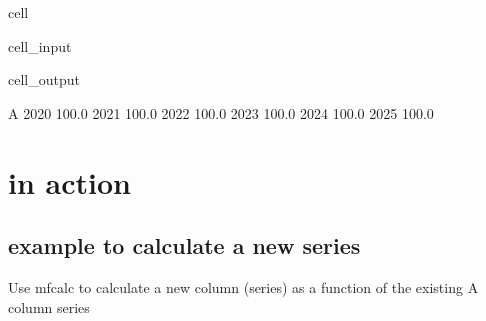 \documentclass[letterpaper,10pt,english]{jupyterBook}
\begin{document}
\begin{sphinxuseclass}{cell}\begin{sphinxVerbatimInput}

\begin{sphinxuseclass}{cell_input}
\begin{sphinxVerbatim}[commandchars=\\\{\}]
                                   
                                               
    \PYG{p}{[}    \PYG{p}{]}           
    \PYG{p}{[}\PYG{p}{]}                                  
   
\end{sphinxVerbatim}

\end{sphinxuseclass}\end{sphinxVerbatimInput}
\begin{sphinxVerbatimOutput}

\begin{sphinxuseclass}{cell_output}
\begin{sphinxVerbatim}[commandchars=\\\{\}]
          A
2020  100.0
2021  100.0
2022  100.0
2023  100.0
2024  100.0
2025  100.0
\end{sphinxVerbatim}

\end{sphinxuseclass}\end{sphinxVerbatimOutput}

\end{sphinxuseclass}

\section{ in action}
\label{\detokenize{content/04_PythonEssentials/mfcalc:mfcalc-in-action}}

\subsection{ example to calculate a new series}
\label{\detokenize{content/04_PythonEssentials/mfcalc:mfcalc-example-to-calculate-a-new-series}}
\sphinxAtStartPar
Use  mfcalc to calculate a new column (series) as a function of the existing A column series
\end{document}
